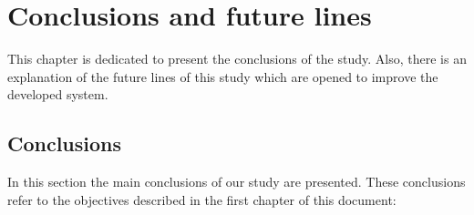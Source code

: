 
\chapter{Conclusions and future lines}
\newpage

This chapter is dedicated to present the conclusions of the study. Also, there is an explanation of the future lines of this study which are opened to improve the developed system.

\section{Conclusions}

In this section the main conclusions of our study are presented. These conclusions refer to the objectives described in the first chapter of this document:

